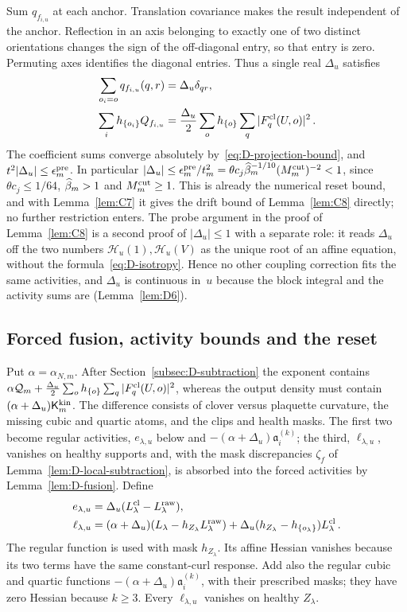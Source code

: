 Sum $q_{f_{i,u}}$ at each anchor. Translation covariance makes the result independent of the anchor. Reflection in an axis belonging to exactly one of two distinct orientations changes the sign of the off-diagonal entry, so that entry is zero. Permuting axes identifies the diagonal entries. Thus a single real $\Delta_u$ satisfies
\begin{align}\label{eq:D-isotropy}
\sum_{o_i=o}q_{f_{i,u}}(q,r)&=\Delta_u\delta_{qr},\notag\\
\sum_i h_{\{o_i\}}Q_{f_{i,u}}
&=\frac{\Delta_u}2\sum_o h_{\{o\}}\sum_q|F^{\rm cl}_q(U,o)|^2\,.
\end{align}
The coefficient sums converge absolutely by~\eqref{eq:D-projection-bound}, and $t^2|\Delta_u|\le\epsilon^{\rm pre}_m$. In particular $|\Delta_u|\le\epsilon^{\rm pre}_m/t_m^2=\theta c_j\widehat{\beta}_m^{-1/10}(M^{\mathrm{cut}}_m)^{-2}<1$, since $\theta c_j\le1/64$, $\widehat{\beta}_m>1$ and $M^{\mathrm{cut}}_m\ge1$. This is already the numerical reset bound, and with Lemma~\ref{lem:C7} it gives the drift bound of Lemma~\ref{lem:C8} directly; no further restriction enters. The probe argument in the proof of Lemma~\ref{lem:C8} is a second proof of $|\Delta_u|\le1$ with a separate role: it reads $\Delta_u$ off the two numbers $\mathcal H_u(1),\mathcal H_u(V)$ as the unique root of an affine equation, without the formula~\eqref{eq:D-isotropy}. Hence no other coupling correction fits the same activities, and $\Delta_u$ is continuous in~$u$ because the block integral and the activity sums are (Lemma~\ref{lem:D6}).

\subsection{Forced fusion, activity bounds and the reset}\label{subsec:D-fusion}

Put $\alpha=\alpha_{N,m}$. After Section~\ref{subsec:D-subtraction} the exponent contains $\alpha\mathcal Q_m+\frac{\Delta_u}2\sum_oh_{\{o\}}\sum_q|F^{\rm cl}_q(U,o)|^2$, whereas the output density must contain $(\alpha+\Delta_u)\mathsf K^{\rm kin}_m$. The difference consists of clover versus plaquette curvature, the missing cubic and quartic atoms, and the clips and health masks. The first two become regular activities, $e_{\lambda,u}$ below and $-(\alpha+\Delta_u)\mathfrak a^{(k)}_i$; the third, $\ell_{\lambda,u}$, vanishes on healthy supports and, with the mask discrepancies $\zeta_f$ of Lemma~\ref{lem:D-local-subtraction}, is absorbed into the forced activities by Lemma~\ref{lem:D-fusion}. Define
\begin{align}\label{eq:D-kinetic-split}
e_{\lambda,u}&=\Delta_u(L^{\rm cl}_\lambda-L^{\rm raw}_\lambda),\notag\\
\ell_{\lambda,u}&=(\alpha+\Delta_u)(L_\lambda-h_{Z_\lambda}L^{\rm raw}_\lambda)
+\Delta_u(h_{Z_\lambda}-h_{\{o_\lambda\}})L^{\rm cl}_\lambda\,.
\end{align}
The regular function is used with mask $h_{Z_\lambda}$. Its affine Hessian vanishes because its two terms have the same constant-curl response. Add also the regular cubic and quartic functions $-(\alpha+\Delta_u)\mathfrak a_i^{(k)}$, with their prescribed masks; they have zero Hessian because $k\ge3$. Every $\ell_{\lambda,u}$ vanishes on healthy $Z_\lambda$.

